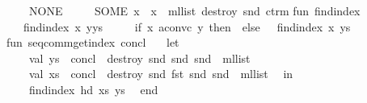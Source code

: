 \begin{isabellebody}
\ \ \ \ NONE\ {}{}\ {}{}\isanewline
\ \ {}\ SOME\ x\ {}{}\ x\ {}{}\ ml{}list\ {}destroy\ {}snd{}\ ctrm{}{}\isanewline
\isanewline
fun\ find{}index\ {}\ {}{}\ {}\ {}\isanewline
\ \ {}\ find{}index\ x\ {}y{}{}ys{}\ {}\isanewline
\ \ \ \ {}if\ x\ aconvc\ y\ then\ {}\ else\ {}\ {}\ find{}index\ x\ ys{}\isanewline
\isanewline
fun\ seq{}comm{}get{}index\ concl\ {}\isanewline
\ \ let\isanewline
\ \ \ \ val\ ys\ {}\ concl\ {}{}\ destroy\ {}snd{}\ snd{}\ snd{}\ {}{}\ ml{}list\isanewline
\ \ \ \ val\ xs\ {}\ concl\ {}{}\ destroy\ {}snd{}\ fst{}\ snd{}\ snd{}\ {}{}\ ml{}list\isanewline
\ \ in\isanewline
\ \ \ \ find{}index\ {}hd\ xs{}\ ys\isanewline
\ \ end\isanewline

\end{isabellebody}
